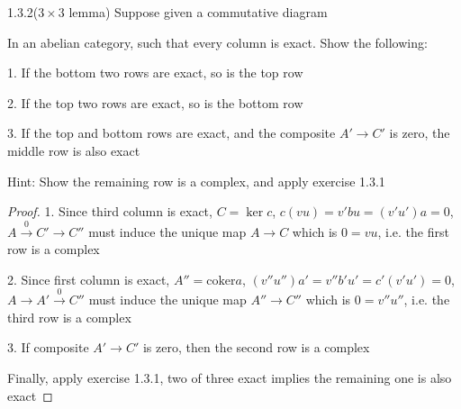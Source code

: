 \documentclass[../main.tex]{subfiles}
\begin{document}
\begin{customexercise}{1.3.2}($3\times3$ lemma) Suppose given a commutative diagram
\begin{center}
\end{center}
In an abelian category, such that every column is exact. Show the following: \par
1. If the bottom two rows are exact, so is the top row \par
2. If the top two rows are exact, so is the bottom row \par
3. If the top and bottom rows are exact, and the composite $A'\to C'$ is zero, the middle row is also exact \par
Hint: Show the remaining row is a complex, and apply exercise 1.3.1
\end{customexercise}

\begin{proof}
1. Since third column is exact, $C=\ker c$, $c(vu)=v'bu=(v'u')a=0$, $A\xrightarrow{0}C'\to C''$ must induce the unique map $A\to C$ which is $0=vu$, i.e. the first row is a complex \par
2. Since first column is exact, $A''=\mathrm{coker}a$, $(v''u'')a'=v''b'u'=c'(v'u')=0$, $A\to A'\xrightarrow{0}C''$ must induce the unique map $A''\to C''$ which is $0=v''u''$, i.e. the third row is a complex \par
3. If composite $A'\to C'$ is zero, then the second row is a complex \par
Finally, apply exercise 1.3.1, two of three exact implies the remaining one is also exact
\end{proof}
\end{document}
